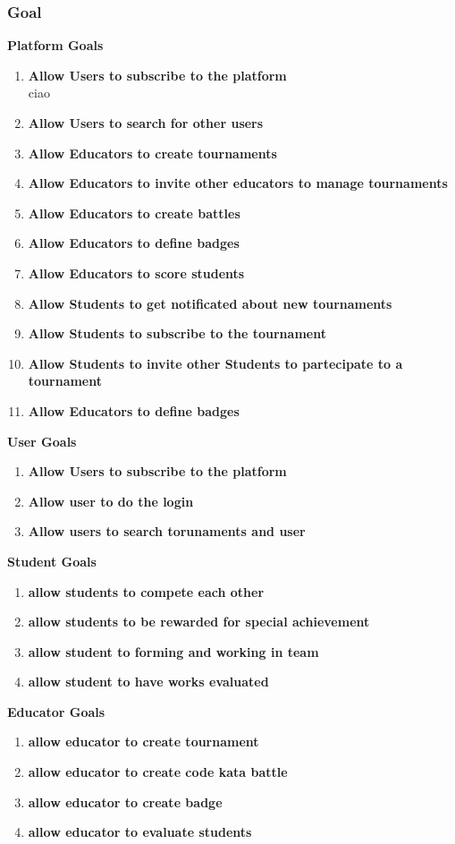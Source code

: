 \documentclass{article}
\begin{document}
\subsubsection{Goal}
\textbf{Platform Goals}
\begin{enumerate}[label=$\bullet$ \textbf{GP\arabic*:}]
    \item \textbf{Allow Users to subscribe to the platform}\\ciao
    \item \textbf{Allow Users to search for other users}
    \item \textbf{Allow Educators to create tournaments}
    \item \textbf{Allow Educators to invite other educators to manage tournaments}
    \item \textbf{Allow Educators to create battles}
    \item \textbf{Allow Educators to define badges}
    \item \textbf{Allow Educators to score students}
    \item \textbf{Allow Students to get notificated about new tournaments}
    \item \textbf{Allow Students to subscribe to the tournament}
    \item \textbf{Allow Students to invite other Students to partecipate to a tournament}
    \item \textbf{Allow Educators to define badges}
\end{enumerate}
\textbf{User Goals}
    \begin{enumerate}[label=$\bullet$ \textbf{GU\arabic*:}]
        \item \textbf{Allow Users to subscribe to the platform}
        \item \textbf{Allow user to do the login}
        \item \textbf{Allow users to search torunaments and user}
    \end{enumerate}
\textbf{Student Goals}
\begin{enumerate}[label=$\bullet$ \textbf{GS\arabic*:}]
    \item \textbf{allow students to compete each other}
    \item \textbf{allow students to be rewarded for special achievement}
    \item \textbf{allow student to forming and working in team}
    \item \textbf{allow student to have works evaluated}
\end{enumerate}
\textbf{Educator Goals}
\begin{enumerate}[label=$\bullet$ \textbf{GE\arabic*:}]
    \item \textbf{allow educator to create tournament}
    \item \textbf{allow educator to create code kata battle}
    \item \textbf{allow educator to create badge}
    \item \textbf{allow educator to evaluate students}
\end{enumerate}
\end{document}
